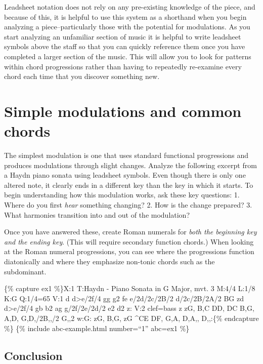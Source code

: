 \documentclass{book}
\begin{document}
Leadsheet notation does not rely on any pre-existing knowledge of the piece,
and because of this, it is helpful to use this system as a shorthand when you
begin analyzing a piece--particularly those with the potential for
modulations. As you start analyzing an unfamiliar section of music it is
helpful to write leadsheet symbols above the staff so that you can quickly
reference them once you have completed a larger section of the music. This
will allow you to look for patterns within chord progressions rather than
having to repeatedly re-examine every chord each time that you discover
something new.

\hypertarget{simple-modulations-and-common-chords}{%
\section{Simple modulations and common
chords}\label{simple-modulations-and-common-chords}}

The simplest modulation is one that uses standard functional progressions and
produces modulations through slight changes. Analyze the following excerpt
from a Haydn piano sonata using leadsheet symbols. Even though there is only
one altered note, it clearly ends in a different key than the key in which it
starts. To begin understanding how this modulation works, ask these key
questions: 1. Where do you first \emph{hear} something changing? 2. How is the
change prepared? 3. What harmonies transition into and out of the modulation?

Once you have answered these, create Roman numerals for \emph{both the
beginning key and the ending key}. (This will require secondary function
chords.) When looking at the Roman numeral progressions, you can see where the
progressions function diatonically and where they emphasize non-tonic chords
such as the subdominant.

\{\% capture ex1 \%\}X:1 T:Haydn - Piano Sonata in G Major, mvt. 3 M:4/4 L:1/8
K:G Q:1/4=65 V:1 d\textbar{} d\textgreater e/2f/4 gg g2 fe\textbar{}
e/2d/2c/2B/2 d/2c/2B/2A/2 BG zd\textbar{} d\textgreater e/2f/4 gb b2
ag\textbar{} g/2f/2e/2d/2 e2 d2 z:\textbar{]} V:2 clef=bass z\textbar{} zG,
B,C DD, DC\textbar{} B,G, A,D, G,D,/2B,,/2 G,,2\textbar{} w:G: zG, B,G, zG
\^{}CE\textbar{} DF, G,A, D,A,, D,,:\textbar{]}\{\% endcapture \%\} \{\%
include abc-example.html number=``1'' abc=ex1 \%\}

\hypertarget{conclusion-13}{%
\subsection{Conclusion}\label{conclusion-13}}
\end{document}
